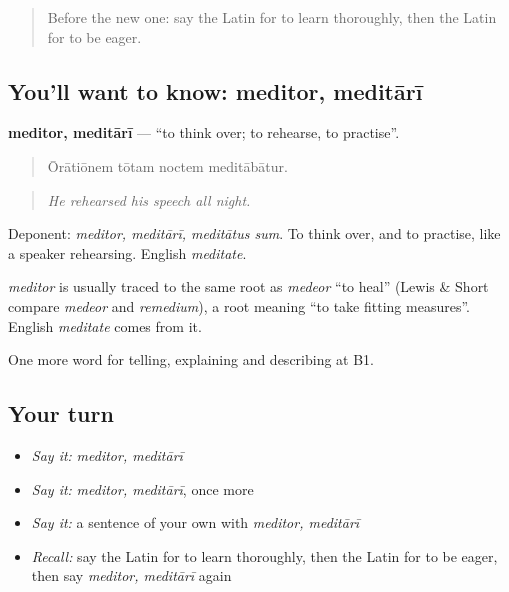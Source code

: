 \begin{quote}
Before the new one: say the Latin for to learn thoroughly, then the Latin for to be eager.
\end{quote}

\subsection*{You'll want to know: meditor, meditārī}
\textbf{meditor, meditārī} — \textquotedblleft{}to think over; to rehearse, to practise\textquotedblright{}.

\begin{quote}
Ōrātiōnem tōtam noctem meditābātur.
\end{quote}

\begin{quote}
\emph{He rehearsed his speech all night.}
\end{quote}

Deponent: \emph{meditor, meditārī, meditātus sum}. To think over, and to practise, like a speaker rehearsing. English \emph{meditate}.

\begin{cousinweb}
\emph{meditor} is usually traced to the same root as \emph{medeor} \textquotedblleft{}to heal\textquotedblright{} (Lewis \& Short compare \emph{medeor} and \emph{remedium}), a root meaning \textquotedblleft{}to take fitting measures\textquotedblright{}. English \emph{meditate} comes from it.
\end{cousinweb}

\begin{grammarlens}[title={What you've built}]
One more word for telling, explaining and describing at B1.
\end{grammarlens}

\subsection*{Your turn}
\begin{itemize}
\raggedright
  \item \emph{Say it:} \emph{meditor, meditārī}
  \item \emph{Say it:} \emph{meditor, meditārī}, once more
  \item \emph{Say it:} a sentence of your own with \emph{meditor, meditārī}
  \item \emph{Recall:} say the Latin for to learn thoroughly, then the Latin for to be eager, then say \emph{meditor, meditārī} again
\end{itemize}

